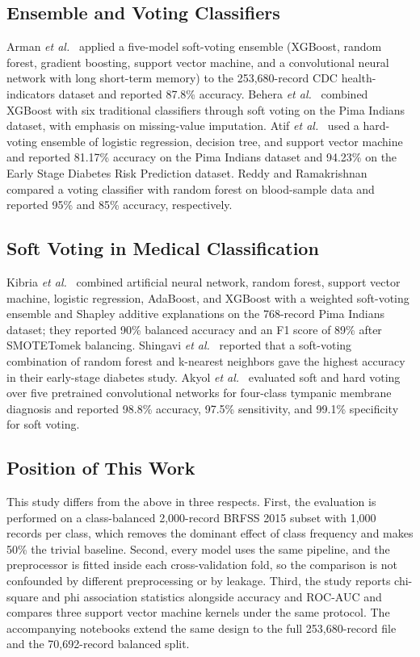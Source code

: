 \documentclass[conference]{IEEEtran}
\begin{document}
\subsection{Ensemble and Voting Classifiers}

Arman \textit{et al.}~\cite{arman2025cjms} applied a five-model soft-voting ensemble (XGBoost, random forest, gradient boosting, support vector machine, and a convolutional neural network with long short-term memory) to the 253,680-record CDC health-indicators dataset and reported 87.8\% accuracy. Behera \textit{et al.}~\cite{behera2021ieee} combined XGBoost with six traditional classifiers through soft voting on the Pima Indians dataset, with emphasis on missing-value imputation. Atif \textit{et al.}~\cite{atif2022} used a hard-voting ensemble of logistic regression, decision tree, and support vector machine and reported 81.17\% accuracy on the Pima Indians dataset and 94.23\% on the Early Stage Diabetes Risk Prediction dataset. Reddy and Ramakrishnan~\cite{reddy2022} compared a voting classifier with random forest on blood-sample data and reported 95\% and 85\% accuracy, respectively.

\subsection{Soft Voting in Medical Classification}

Kibria \textit{et al.}~\cite{kibria2022sensors} combined artificial neural network, random forest, support vector machine, logistic regression, AdaBoost, and XGBoost with a weighted soft-voting ensemble and Shapley additive explanations on the 768-record Pima Indians dataset; they reported 90\% balanced accuracy and an F1 score of 89\% after SMOTETomek balancing. Shingavi \textit{et al.}~\cite{shingavi2024ieee} reported that a soft-voting combination of random forest and k-nearest neighbors gave the highest accuracy in their early-stage diabetes study. Akyol \textit{et al.}~\cite{akyol2024springer} evaluated soft and hard voting over five pretrained convolutional networks for four-class tympanic membrane diagnosis and reported 98.8\% accuracy, 97.5\% sensitivity, and 99.1\% specificity for soft voting.

\subsection{Position of This Work}

This study differs from the above in three respects. First, the evaluation is performed on a class-balanced 2,000-record BRFSS 2015 subset with 1,000 records per class, which removes the dominant effect of class frequency and makes 50\% the trivial baseline. Second, every model uses the same pipeline, and the preprocessor is fitted inside each cross-validation fold, so the comparison is not confounded by different preprocessing or by leakage. Third, the study reports chi-square and phi association statistics alongside accuracy and ROC-AUC and compares three support vector machine kernels under the same protocol. The accompanying notebooks extend the same design to the full 253,680-record file and the 70,692-record balanced split.
\end{document}

